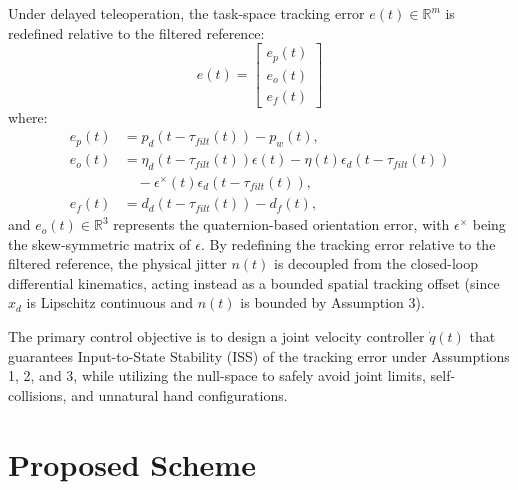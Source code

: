 \documentclass[letterpaper,journal]{IEEEtran}
\begin{document}
Under delayed teleoperation, the task-space tracking error $e(t) \in \mathbb{R}^m$ is redefined relative to the filtered reference:
\begin{equation}
e(t) = \begin{bmatrix} e_p(t) \\ e_o(t) \\ e_f(t) \end{bmatrix}
\end{equation}
where:
\begin{align}
e_p(t) &= p_{d}(t-\tau_{filt}(t)) - p_w(t), \\
e_o(t) &= \eta_d(t-\tau_{filt}(t))\epsilon(t) - \eta(t)\epsilon_d(t-\tau_{filt}(t)) \nonumber \\
&\quad - \epsilon^\times(t)\epsilon_d(t-\tau_{filt}(t)), \\
e_f(t) &= d_{d}(t-\tau_{filt}(t)) - d_f(t),
\end{align}
and $e_o(t) \in \mathbb{R}^3$ represents the quaternion-based orientation error, with $\epsilon^\times$ being the skew-symmetric matrix of $\epsilon$. By redefining the tracking error relative to the filtered reference, the physical jitter $n(t)$ is decoupled from the closed-loop differential kinematics, acting instead as a bounded spatial tracking offset (since $x_d$ is Lipschitz continuous and $n(t)$ is bounded by Assumption 3).

The primary control objective is to design a joint velocity controller $\dot{q}(t)$ that guarantees Input-to-State Stability (ISS) of the tracking error under Assumptions 1, 2, and 3, while utilizing the null-space to safely avoid joint limits, self-collisions, and unnatural hand configurations.

\section{Proposed Scheme}
\end{document}
